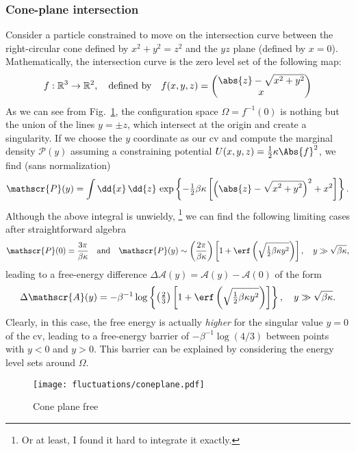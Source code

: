 \subsubsection*{Cone-plane intersection}

Consider a particle constrained to move on the intersection curve between the right-circular cone defined by $x^{2} + y^{2} = z^{2}$ and the $yz$ plane (defined by $x = 0$).
Mathematically, the intersection curve is the zero level set of the following map:
%
\begin{equation}
  f: \mathbb{R}^{3} \to \mathbb{R}^{2},
  \quad\text{defined by}\quad
  f(x,y,z) =
  \begin{pmatrix}
    \abs{z} - \sqrt{x^{2} + y^{2}}\\
    x
  \end{pmatrix}
\end{equation}
%
As we can see from Fig.~\ref{fig:coneplane}, the configuration space $\Omega = f^{-1}(0)$ is nothing but the union of the lines $y = \pm z$, which intersect at the origin and create a singularity.
If we choose the $y$ coordinate as our \ac{cv} and compute the marginal density $\mathscr{P}(y)$ assuming a constraining potential $U(x, y, z) = \tfrac{1}{2}\kappa\Abs{f}^{2}$, we find (sans normalization)
%
\begin{equation}
  \mathscr{P}(y) = \int \dd{x}\,\dd{z}\,\exp\left\{-\tfrac{1}{2}\beta\kappa\left[\left(\smash[b]{\abs{z} - \sqrt{\smash[b]{x^{2} + y^{2}}}}\right)^{2} + x^{2}\right]\right\}.
\end{equation}
%
Although the above integral is unwieldy,%
\footnote{Or at least, I found it hard to integrate it exactly.}
we can find the following limiting cases after straightforward algebra
%
\begin{equation}
  \mathscr{P}(0) = \frac{3\pi}{\beta\kappa}
  \quad\text{and}\quad
  \mathscr{P}(y) \sim \left(\frac{2\pi}{\beta\kappa}\right)\left[1+\erf\left(\sqrt{\tfrac{1}{2}{\beta\kappa y^{2}}}\right)\right],
  \quad y \gg \sqrt{\smash[b]{\beta\kappa}},
\end{equation}
%
leading to a free-energy difference $\Delta\mathscr{A}(y) = \mathscr{A}(y) - \mathscr{A}(0)$ of the form
%
\begin{equation}
  \Delta\mathscr{A}(y) = -\beta^{-1} \log\left\{\left(\tfrac{2}{3}\right)\left[1+\erf\left(\sqrt{\tfrac{1}{2}{\beta\kappa y^{2}}}\right)\right]\right\},
  \quad y \gg \sqrt{\smash[b]{\beta\kappa}}.
\end{equation}
%
Clearly, in this case, the free energy is actually \emph{higher} for the singular value $y = 0$ of the \ac{cv}, leading to a free-energy barrier of $-\beta^{-1}\log(4/3)$ between points with $y < 0$ and $y > 0$.
This barrier can be explained by considering the energy level sets around $\Omega$.
%
\begin{figure}
  \begin{center}
    \texttt{[image: fluctuations/coneplane.pdf]}
  \end{center}
  \caption{Cone plane free}
  \label{fig:coneplane}
\end{figure}
